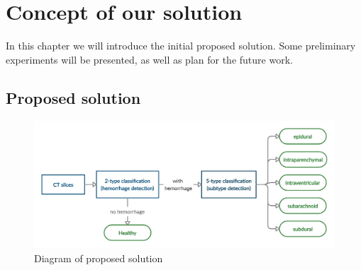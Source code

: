 \chapter{Concept of our solution} %
In this chapter we will introduce the initial proposed solution. Some preliminary experiments will be presented, as well as plan for the future work.
\section{Proposed solution}

\begin{figure}[!ht]
\begin{centering}
\includegraphics[width=16cm]{assets/images/mySolution.png}
\par\end{centering}
\caption{Diagram of proposed solution \label{fig:solution}}
\end{figure}

